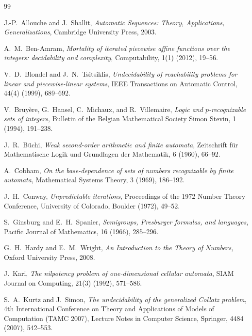 \documentclass[runningheads]{llncs}
\begin{document}
\begin{thebibliography}{99}

J.-P.~Allouche and J.~Shallit,
\emph{Automatic Sequences: Theory, Applications, Generalizations},
Cambridge University Press, 2003.

A.~M.~Ben-Amram,
\emph{Mortality of iterated piecewise affine functions over the
integers: decidability and complexity},
Computability, 1(1) (2012), 19--56.

V.~D.~Blondel and J.~N.~Tsitsiklis,
\emph{Undecidability of reachability problems for linear and
piecewise-linear systems},
IEEE Transactions on Automatic Control, 44(4) (1999), 689--692.

V.~Bruy\`ere, G.~Hansel, C.~Michaux, and R.~Villemaire,
\emph{Logic and $p$-recognizable sets of integers},
Bulletin of the Belgian Mathematical Society Simon Stevin, 1 (1994),
191--238.

J.~R.~B\"uchi,
\emph{Weak second-order arithmetic and finite automata},
Zeitschrift f\"ur Mathematische Logik und Grundlagen der Mathematik, 6
(1960), 66--92.

A.~Cobham,
\emph{On the base-dependence of sets of numbers recognizable by finite
automata},
Mathematical Systems Theory, 3 (1969), 186--192.

J.~H.~Conway,
\emph{Unpredictable iterations},
Proceedings of the 1972 Number Theory Conference, University of
Colorado, Boulder (1972), 49--52.

S.~Ginsburg and E.~H.~Spanier,
\emph{Semigroups, Presburger formulas, and languages},
Pacific Journal of Mathematics, 16 (1966), 285--296.

G.~H.~Hardy and E.~M.~Wright,
\emph{An Introduction to the Theory of Numbers},
Oxford University Press, 2008.

J.~Kari,
\emph{The nilpotency problem of one-dimensional cellular automata},
SIAM Journal on Computing, 21(3) (1992), 571--586.

S.~A.~Kurtz and J.~Simon,
\emph{The undecidability of the generalized Collatz problem},
4th International Conference on Theory and Applications of Models of
Computation (TAMC 2007), Lecture Notes in Computer Science, Springer,
4484 (2007), 542--553.


\end{thebibliography}
\end{document}
